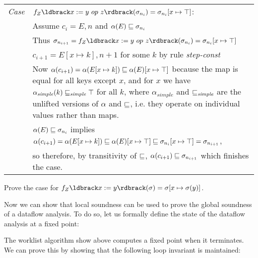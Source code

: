 \documentclass[11pt]{article}
\begin{document}
\begin{tabularx}{\textwidth}{lX}
\\
\emph{Case} & $f_Z\parg{x := y ~op~ z}(\sigma_{n_i}) = \sigma_{n_i}[x \mapsto \top]$: \\
 & Assume $c_i = E,n$ and $\alpha(E) \sqsubseteq \sigma_{n_i}$ \\
 & Thus $\sigma_{n_{i+1}} = f_Z\parg{x := y ~op~ z}(\sigma_{n_i}) = \sigma_{n_i}[x \mapsto \top]$ \\
 & $c_{i+1} = E[x \mapsto k],n+1$ for some $k$ by rule \textit{step-const} \\
 &  Now $\alpha(c_{i+1}) = \alpha(E[x \mapsto k]) \sqsubseteq \alpha(E)[x \mapsto \top]$ because the map is equal for all keys except $x$, and for $x$ we have $\alpha_\textit{simple}(k) \sqsubseteq_\textit{simple} \top$ for all $k$, where $\alpha_\textit{simple}$ and $\sqsubseteq_\textit{simple}$ are the unlifted versions of $\alpha$ and $\sqsubseteq$, i.e. they operate on individual values rather than maps. \\
 & $\alpha(E) \sqsubseteq \sigma_{n_i}$ implies $\alpha(c_{i+1}) = \alpha(E[x \mapsto k]) \sqsubseteq \alpha(E)[x \mapsto \top] \sqsubseteq \sigma_{n_i}[x \mapsto \top] = \sigma_{n_{i+1}}$, \\
&  so therefore, by transitivity of $\sqsubseteq$, $\alpha(c_{i+1}) \sqsubseteq \sigma_{n_{i+1}}$ which finishes the case. \\
 \end{tabularx}

  Prove the case for $f_Z\parg{x := y}(\sigma) = \sigma[x \mapsto \sigma(y)]$.



Now we can show that local soundness can be used to prove the global soundness of a dataflow analysis.  To do so, let us formally define the state of the dataflow analysis at a fixed point:


\vspace{1em}

\noindent The worklist algorithm show above computes a fixed point when it terminates.  We can prove this by showing that the following loop invariant is maintained:
\end{document}
